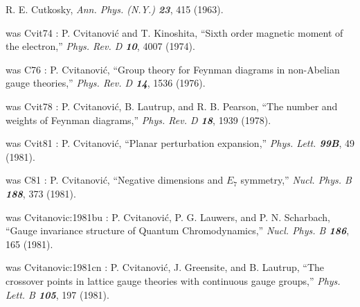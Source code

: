 
R. E. Cutkosky,
{\em Ann. Phys. (N.Y.)  \bf 23}, 415 (1963).

was Cvit74 :
 P. Cvitanovi\'c and T. Kinoshita,
    ``Sixth order magnetic moment of the electron,''
    {\em Phys. Rev. D \bf 10}, 4007 (1974).

was C76 :
 P. Cvitanovi\'c,
``Group theory for Feynman diagrams in non-Abelian gauge theories,''
    {\em Phys. Rev.  D \bf 14}, 1536 (1976).

%

was Cvit78 :
 P. Cvitanovi\'c, B. Lautrup, and R. B. Pearson,
    ``The number and weights of Feynman diagrams,''
    {\em Phys. Rev. D \bf 18}, 1939 (1978).

was Cvit81 :
 P. Cvitanovi\'c,
    ``Planar perturbation expansion,''
    {\em Phys. Lett. \bf 99B}, 49 (1981).

was C81 :
  P. Cvitanovi\'c,
    ``Negative dimensions and $E_7$ symmetry,''
    {\em Nucl. Phys. B \bf 188}, 373 (1981).

was Cvitanovic:1981bu :
 P. Cvitanovi\'c, P. G. Lauwers, and P. N. Scharbach,
    ``Gauge invariance structure of Quantum Chromodynamics,''
    {\em Nucl.  Phys.  B \bf 186}, 165 (1981).

was Cvitanovic:1981cn :
 P. Cvitanovi\'c, J. Greensite, and B. Lautrup,
    ``The crossover points in lattice gauge theories with
    continuous gauge groups,''
    {\em Phys.  Lett.  B \bf 105}, 197 (1981).


